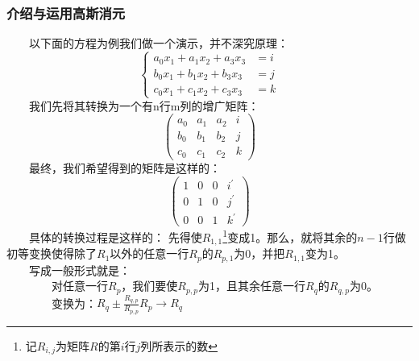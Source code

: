 \documentclass[12pt]{article}
\begin{document}
          \subsubsection{介绍与运用高斯消元}
            　　以下面的方程为例我们做一个演示，并不深究原理：
            \begin{equation}
              \left\{
                \begin{aligned}
                  a_{0}x_{1}+a_{1}x_{2}+a_{3}x_{3}&=i\\
                  b_{0}x_{1}+b_{1}x_{2}+b_{3}x_{3}&=j\\
                  c_{0}x_{1}+c_{1}x_{2}+c_{3}x_{3}&=k
                \end{aligned}
              \right.
            \end{equation}
            　　我们先将其转换为一个有n行m列的增广矩阵：
            \begin{equation}
              \left (
                \begin{array}{ccc|c}
                  a_{0} & a_{1} & a_{2} & i \\
                  b_{0} & b_{1} & b_{2} & j \\
                  c_{0} & c_{1} & c_{2} & k
                \end{array}
              \right)
            \end{equation}
            　　最终，我们希望得到的矩阵是这样的：
            \begin{equation}
              \left (
                \begin{array}{ccc|c}
                  1 & 0 & 0 & i^{'} \\
                  0 & 1 & 0 & j^{'} \\
                  0 & 0 & 1 & k^{'}
                \end{array}
              \right)
            \end{equation}
            　　具体的转换过程是这样的：
            先得使$R_{1,1}$\footnote{记$R_{i,j}$为矩阵$R$的第$i$行$j$列所表示的数}变成1。那么，就将其余的$n-1$行做初等变换使得除了$R_{1}$以外的任意一行$R_{p}$的$R_{p,1}$为0，并把$R_{1,1}$变为1。\\
            　　写成一般形式就是：\\
            　　　　对任意一行$R_{p}$，我们要使$R_{p,p}$为1，且其余任意一行$R_{q}$的$R_{q,p}$为0。\\
            　　　　变换为：$R_{q}\pm{}\frac{R_{q,p}}{R_{p,p}}R_{p}\rightarrow{}R_{q}$\\
\end{document}
